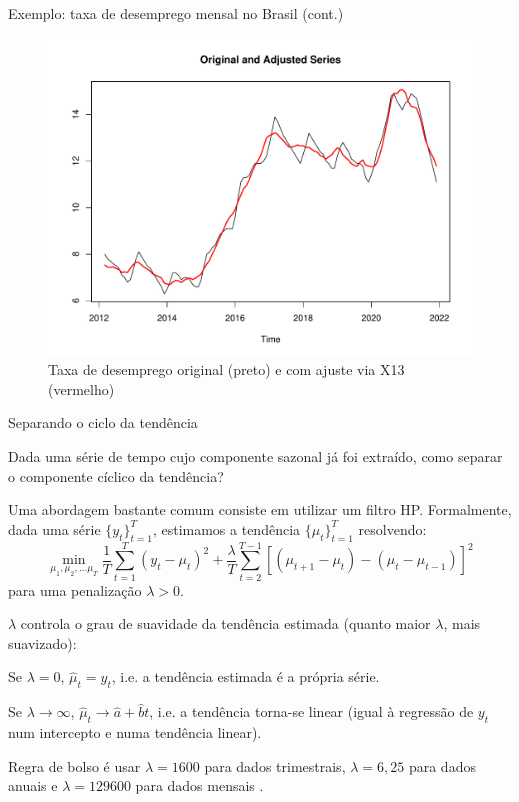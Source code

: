 \documentclass[11pt]{beamer}
\newenvironment{halfwideitemize}{\itemize\addtolength{\itemsep}{0.5em}}{\enditemize}
\newenvironment{halfwideenumerate}{\enumerate\addtolength{\itemsep}{0.5em}}{\endenumerate}
\begin{document}
\begin{frame}{Exemplo: taxa de desemprego mensal no Brasil (cont.)}
	\begin{figure}
		\caption{Taxa de desemprego original (preto) e com ajuste via X13 (vermelho)}
		\includegraphics[scale=0.4]{graficos/desemprego_x13.pdf}
	\end{figure}
\end{frame}

\begin{frame}{Separando o ciclo da tendência}
	\begin{halfwideitemize}
		\item Dada uma série de tempo cujo componente sazonal já foi extraído, como separar o componente cíclico da tendência?
		\item Uma abordagem bastante comum consiste em utilizar um {\color{blue}filtro HP}. Formalmente, dada uma série $\{y_t\}_{t=1}^T$,  estimamos a tendência $\{\mu_t\}_{t=1}^T$ resolvendo:
		\begin{equation}
			\min_{\mu_1, \mu_2,\ldots \mu_T} \frac{1}{T} \sum_{t=1}^{T} (y_t - \mu_t)^2 + \frac{\lambda}{T} \sum_{t=2}^{T-1}[(\mu_{t+1}-\mu_t) -(\mu_t - \mu_{t-1})]^2
		\end{equation}
		para uma {\color{blue}penalização} $\lambda > 0$.
		\item $\lambda$ controla o grau de suavidade da tendência estimada (quanto maior $\lambda$, mais suavizado):
		\begin{halfwideenumerate}
			\item Se $\lambda  = 0$, $\hat{\mu}_t = y_t$, i.e. a tendência estimada é a própria série.
			\item Se $\lambda \to \infty$, $\hat{\mu}_t \to \hat{a} + \hat{b} t$, i.e. a tendência torna-se linear (igual à regressão de $y_t$ num intercepto e numa tendência linear).
		\end{halfwideenumerate}
		\item Regra de bolso é usar $\lambda = 1600$ para dados trimestrais, $\lambda =  6,25$ para dados anuais e $\lambda = 129600$ para dados mensais \citep{Ravn2002}.
	\end{halfwideitemize}
\end{frame}
\end{document}
